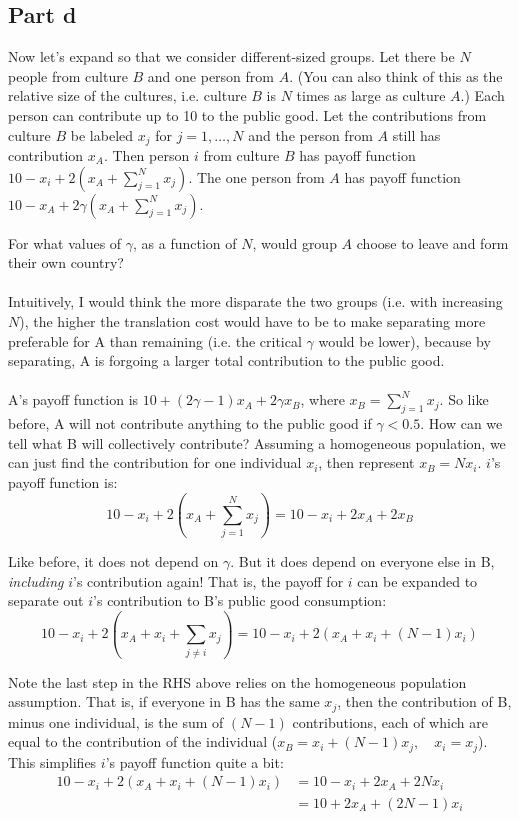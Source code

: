\documentclass[10pt]{article}
\begin{document}
\newpage

\subsection*{Part d} Now let's expand so that we consider different-sized groups. Let there be $N$ people from culture $B$ and one person from $A$. (You can also think of this as the relative size of the cultures, i.e. culture $B$ is $N$ times as large as culture $A$.) Each person can contribute up to 10 to the public good. Let the contributions from culture $B$ be labeled $x_j$ for $j=1,\ldots,N$ and the person from $A$ still has contribution $x_A$. Then person $i$ from culture $B$ has payoff function $10-x_i+2\left(x_A+\sum_{j=1}^{N}x_j\right)$. The one person from $A$ has payoff function $10-x_A+2\gamma\left(x_A+\sum_{j=1}^{N}x_j\right)$.

For what values of $\gamma$, as a function of $N$, would group $A$ choose to leave and form their own country?
\\ \\
Intuitively, I would think the more disparate the two groups (i.e. with increasing $N$), the higher the translation cost would have to be to make separating more preferable for A than remaining (i.e. the critical $\gamma$ would be lower), because by separating, A is forgoing a larger total contribution to the public good.
\\ \\
A's payoff function is $10 + (2\gamma - 1)x_A + 2\gamma x_B$, where $x_B = \sum_{j=1}^N x_j$. So like before, A will not contribute anything to the public good if $\gamma < 0.5$. How can we tell what B will collectively contribute? Assuming a homogeneous population, we can just find the contribution for one individual $x_i$, then represent $x_B = Nx_i$. $i$'s payoff function is:
\[
10 - x_i + 2(x_A + \sum_{j=1}^{N} x_j) = 10 - x_i + 2x_A + 2x_B
\]

Like before, it does not depend on $\gamma$. But it does depend on everyone else in B, \emph{including} $i$'s contribution again! That is, the payoff for $i$ can be expanded to separate out $i$'s contribution to B's public good consumption:
\[
10 - x_i + 2(x_A + x_i + \sum_{j \neq i} x_j) = 10 - x_i + 2(x_A + x_i + (N-1)x_i)
\]

Note the last step in the RHS above relies on the homogeneous population assumption. That is, if everyone in B has the same $x_j$, then the contribution of B, minus one individual, is the sum of $(N-1)$ contributions, each of which are equal to the contribution of the individual ($x_B = x_i + (N-1)x_j, \quad x_i = x_j$). This simplifies $i$'s payoff function quite a bit:
\[
\begin{aligned}
10 - x_i + 2(x_A + x_i + (N-1)x_i) &= 10 - x_i + 2x_A + 2Nx_i \\
&= 10 + 2x_A + (2N-1)x_i
\end{aligned}
\]
\end{document}
